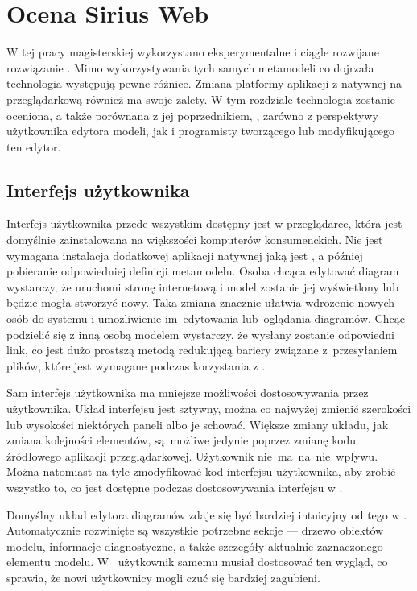 \chapter{Ocena Sirius Web}

W tej pracy magisterskiej wykorzystano eksperymentalne i ciągle
rozwijane rozwiązanie \SiriusWeb{}.
Mimo wykorzystywania tych samych metamodeli \EMF{} co dojrzała technologia
\SiriusDesktop{} występują pewne różnice. Zmiana platformy aplikacji z
natywnej na przeglądarkową również ma swoje zalety. W tym rozdziale technologia
\SiriusWeb{} zostanie oceniona, a także porównana z jej poprzednikiem,
\SiriusDesktop{}, zarówno z perspektywy użytkownika edytora modeli, jak i
programisty tworzącego lub modyfikującego ten edytor.

\section{Interfejs użytkownika}

Interfejs użytkownika \SiriusWeb{} przede wszystkim dostępny jest w
przeglądarce, która jest domyślnie zainstalowana
na większości komputerów konsumenckich. Nie jest wymagana instalacja dodatkowej
aplikacji natywnej jaką jest \SiriusDesktop{}, a później pobieranie
odpowiedniej definicji metamodelu. Osoba chcąca edytować diagram wystarczy, że
uruchomi stronę internetową i model zostanie jej wyświetlony lub będzie mogła
stworzyć nowy. Taka zmiana
znacznie ułatwia wdrożenie nowych osób do systemu i umożliwienie im~edytowania
lub~oglądania diagramów. Chcąc podzielić się z inną osobą modelem
wystarczy, że wysłany zostanie odpowiedni link, co jest dużo prostszą metodą
redukującą bariery związane z~przesyłaniem plików, które jest wymagane podczas
korzystania z \SiriusDesktop{}.

Sam interfejs użytkownika ma mniejsze możliwości dostosowywania przez
użytkownika. Układ
interfejsu jest sztywny, można co najwyżej zmienić szerokości lub wysokości
niektórych paneli albo je schować. Większe zmiany układu, jak zmiana kolejności
elementów, są~możliwe jedynie poprzez zmianę kodu źródłowego aplikacji
przeglądarkowej. Użytkownik nie~ma~na~nie~wpływu. Można natomiast na tyle
zmodyfikować kod interfejsu użytkownika, aby zrobić wszystko to, co jest
dostępne podczas dostosowywania interfejsu w \SiriusDesktop{}.

Domyślny układ edytora diagramów zdaje się być bardziej intuicyjny od tego w
\SiriusDesktop{}. Automatycznie rozwinięte są wszystkie potrzebne sekcje
--- drzewo obiektów modelu, informacje diagnostyczne, a także szczegóły
aktualnie zaznaczonego elementu modelu. W~\SiriusDesktop{} użytkownik
samemu musiał dostosować ten wygląd, co sprawia, że nowi użytkownicy mogli czuć
się bardziej zagubieni.

